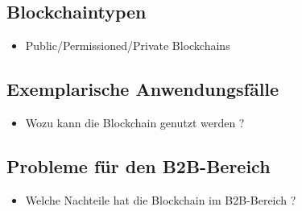 \subsection{Blockchaintypen}
\begin{itemize}
  \item Public/Permissioned/Private Blockchains
\end{itemize}

\subsection{Exemplarische Anwendungsfälle}
\begin{itemize}
    \item Wozu kann die Blockchain genutzt werden ?
\end{itemize}

\subsection{Probleme für den B2B-Bereich}
\begin{itemize}
    \item Welche Nachteile hat die Blockchain im B2B-Bereich ?
\end{itemize}
